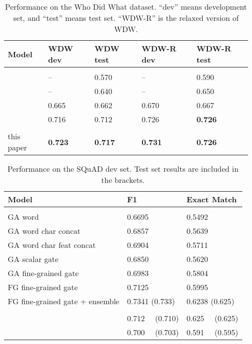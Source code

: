 \documentclass{article} \usepackage{iclr2017_conference,times}
\begin{document}
\begin{table}[t]
\caption{\small Performance on the Who Did What dataset. ``dev'' means development set, and ``test'' means test set. ``WDW-R'' is the relaxed version of WDW.}
\label{tab:wdw}
\begin{center}
\begin{tabular}{lllll}
Model & WDW dev & WDW test & WDW-R dev & WDW-R test
\\ \hline \\
\cite{kadlec2016text} & -- & 0.570 & -- & 0.590 \\
\cite{chen2016thorough} & -- & 0.640 & -- & 0.650  \\
\cite{munkhdalai2016neural} & 0.665 & 0.662 & 0.670 & 0.667 \\
\cite{dhingra2016gated} & 0.716 & 0.712 & 0.726 & \textbf{0.726} \\
\hline \\
this paper & \textbf{0.723} & \textbf{0.717} & \textbf{0.731} & \textbf{0.726}
\end{tabular}
\end{center}
\end{table}

\begin{table}[t]
\caption{\small Performance on the SQuAD dev set. Test set results are included in the brackets.}
\label{tab:sq}
\begin{center}
\begin{tabular}{lll}
Model & F1 & Exact Match
\\ \hline \\
GA word & 0.6695 & 0.5492 \\
GA word char concat & 0.6857 & 0.5639 \\
GA word char feat concat & 0.6904 & 0.5711 \\
GA scalar gate & 0.6850 & 0.5620 \\
GA fine-grained gate & 0.6983 & 0.5804 \\
FG fine-grained gate & 0.7125 & 0.5995 \\
FG fine-grained gate + ensemble & 0.7341 (0.733) & 0.6238 (0.625) \\
\hline \\
\cite{yu2016chunk} & 0.712~~ (0.710) & 0.625~~ (0.625) \\
\cite{wang2016machine} & 0.700~~ (0.703) & 0.591~~ (0.595)
\end{tabular}
\end{center}
\end{table}
\end{document}
